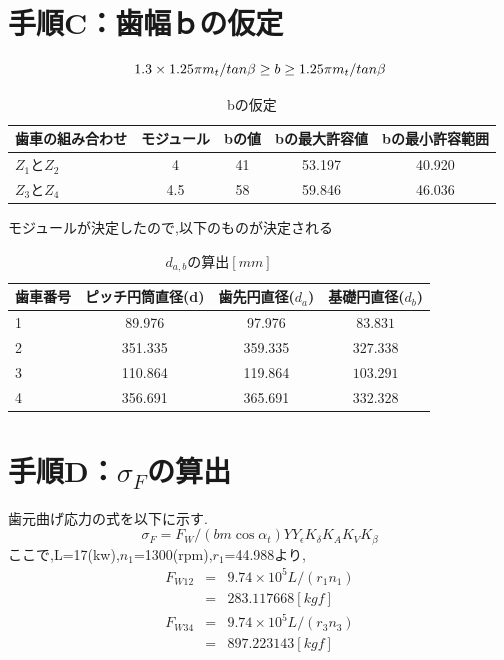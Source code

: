 \documentclass[a4j,twoside,openright,11pt]{jreport}
\begin{document}
\section{手順C：歯幅ｂの仮定}
\begin{equation}
1.3\times1.25 \pi m_t /tan{\beta} \geq b \geq 1.25 \pi m_t /tan{\beta}\nonumber\\
\end{equation}
\begin{table}[htb]
\begin{center}
  \caption{bの仮定}
  \begin{tabular}{|l|c|c|c|c|} \hline
    歯車の組み合わせ&モジュール&bの値&bの最大許容値&bの最小許容範囲\\\hline
    $Z_1とZ_2$&4&41&53.197&40.920\\
    $Z_3とZ_4$&4.5&58&59.846&46.036\\
    \hline
  \end{tabular}
\end{center}
\end{table}

モジュールが決定したので,以下のものが決定される
\begin{table}[htb]
\begin{center}
  \caption{$d_{a,b}の算出[mm]$}
  \begin{tabular}{|l|c|c|c|} \hline
    歯車番号&ピッチ円筒直径(d)&歯先円直径($d_a$)&基礎円直径($d_b$)\\\hline
    1       &89.976  &97.976  &$ 83.831$\\
    2       &351.335 &359.335 &$327.338$\\
    3       &110.864 &119.864 &$103.291$\\
    4       &356.691 &365.691 &$332.328$\\
    \hline
  \end{tabular}
\end{center}
\end{table}

\section{手順D：$\sigma_F$の算出}
歯元曲げ応力の式を以下に示す.
\begin{equation}
\sigma_F=F_W/(bm\cos{\alpha_t})YY_{\epsilon}K_{\delta}K_AK_VK_{\beta}\nonumber
\end{equation}
ここで,L=17(kw),$n_1$=1300(rpm),$r_1$=44.988より,
\begin{eqnarray}
F_{W12} &=& 9.74\times10^5L/(r_1n_1)\nonumber\\
       &=& 283.117668[kgf]\nonumber\\
F_{W34} &=& 9.74\times10^5L/(r_3n_3)\nonumber\\
       &=& 897.223143[kgf]\nonumber
\end{eqnarray}
\end{document}
